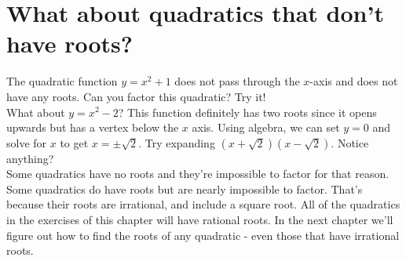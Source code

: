 \documentclass[12pt,fleqn]{book}
\begin{document}
\section*{What about quadratics that don't have roots?}
The quadratic function $y=x^2+1$ does not pass through the $x$-axis and does not have any roots.  Can you factor this quadratic?  Try it!
\\[4em]
What about $y=x^2 - 2$?  This function definitely has two roots since it opens upwards but has a vertex below the $x$ axis.  Using algebra, we can set $y=0$ and solve for $x$ to get $x=\pm \sqrt 2$.  Try expanding $(x+\sqrt 2)(x-\sqrt 2)$.  Notice anything?
\\[4em]
Some quadratics have no roots and they're impossible to factor for that reason.  Some quadratics do have roots but are nearly impossible to factor.  That's because their roots are irrational, and include a square root.  All of the quadratics in the exercises of this chapter will have rational roots.  In the next chapter we'll figure out how to find the roots of any quadratic - even those that have irrational roots.
\end{document}
